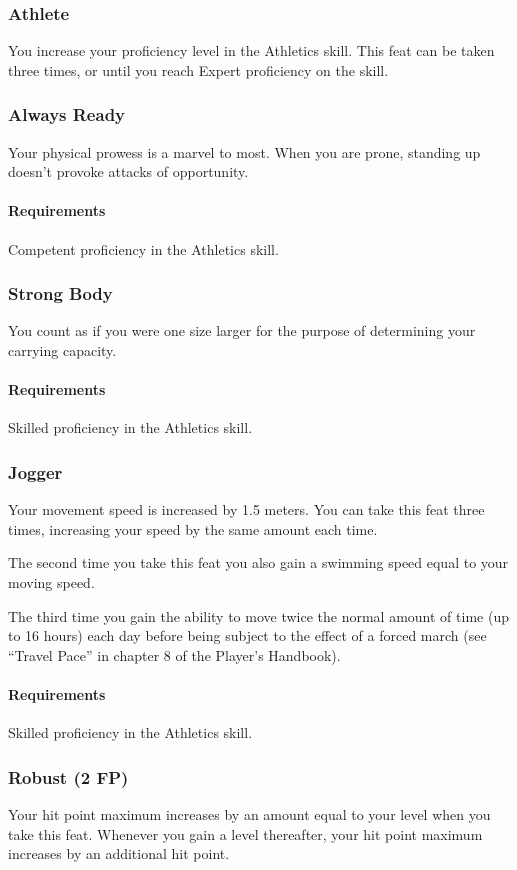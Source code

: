 \subsubsection{Athlete} \label{feat::athlete}
    You increase your proficiency level in the Athletics skill.
    This feat can be taken three times, or until you reach Expert proficiency on the skill.
\subsubsection{Always Ready} \label{feat::alwaysready}
    Your physical prowess is a marvel to most.
    When you are prone, standing up doesn't provoke attacks of opportunity.
    \paragraph{Requirements} Competent proficiency in the Athletics skill.
\subsubsection{Strong Body} \label{feat::strongbody}
    You count as if you were one size larger for the purpose of determining your carrying capacity.
    \paragraph{Requirements} Skilled proficiency in the Athletics skill.
\subsubsection{Jogger} \label{feat::jogger}
    Your movement speed is increased by 1.5 meters.
    You can take this feat three times, increasing your speed by the same amount each time.

    The second time you take this feat you also gain a swimming speed equal to your moving speed.

    The third time you gain the ability to move twice the normal amount of time (up to 16 hours) each day before being subject to the effect of a forced march (see ``Travel Pace'' in chapter 8 of the Player's Handbook).
    \paragraph{Requirements} Skilled proficiency in the Athletics skill.
\subsubsection{Robust (2 FP)} \label{feat::robust}
    Your hit point maximum increases by an amount equal to your level when you take this feat.
    Whenever you gain a level thereafter, your hit point maximum increases by an additional hit point.
